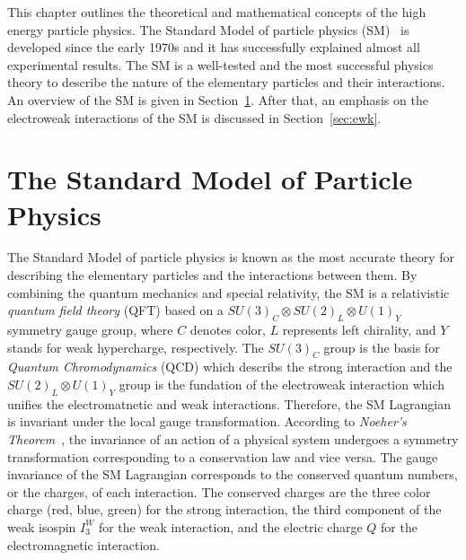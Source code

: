 This chapter outlines the theoretical and mathematical concepts of the high energy particle physics.
The Standard Model of particle physics (SM)~\cite{BF02726525,Glashow,PhysRevLett.19.1264,Herrero:1998eq,CBO9780511791406} is developed since the early 1970s and it has successfully explained almost all experimental results.
The SM is a well-tested and the most successful physics theory to describe the nature of the elementary particles and their interactions.
An overview of the SM is given in Section~\ref{sec:sm}.
After that, an emphasis on the electroweak interactions of the SM is discussed in Section~\ref{sec:ewk}.


\section{The Standard Model of Particle Physics}
\label{sec:sm}
The Standard Model of particle physics is known as the most accurate theory for describing the elementary particles and the interactions between them.
By combining the quantum mechanics and special relativity, the SM is a relativistic \textit{quantum field theory} (QFT) based on a $SU(3)_{C} \otimes SU(2)_{L} \otimes U(1)_{Y}$ symmetry gauge group, where $C$ denotes color, $L$ represents left chirality, and $Y$ stands for weak hypercharge, respectively.
The $SU(3)_{C}$ group is the basis for \textit{Quantum Chromodynamics} (QCD) which describs the strong interaction and the $SU(2)_{L} \otimes U(1)_{Y}$ group is the fundation of the electroweak interaction which unifies the electromatnetic and weak interactions.
Therefore, the SM Lagrangian is invariant under the local gauge transformation.
According to \textit{Noeher's Theorem}~\cite{00411457108231446}, the invariance of an action of a physical system undergoes a symmetry transformation corresponding to a conservation law and vice versa. 
The gauge invariance of the SM Lagrangian corresponds to the conserved quantum numbers, or the charges, of each interaction.
The conserved charges are the three color charge (red, blue, green) for the strong interaction, the third component of the weak isospin $I_{3}^{W}$ for the weak interaction, and the electric charge $Q$ for the electromagnetic interaction.


